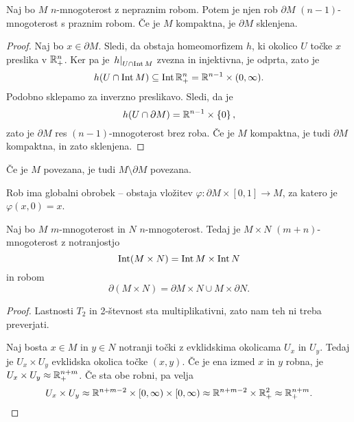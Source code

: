 \begin{izrek}
Naj bo $M$ $n$-mnogoterost z nepraznim robom. Potem je njen rob
$\partial M$ $(n-1)$-mnogoterost s praznim robom. Če je $M$
kompaktna, je $\partial M$ sklenjena.
\end{izrek}

\begin{proof}
Naj bo $x \in \partial M$. Sledi, da obstaja homeomorfizem $h$,
ki okolico $U$ točke $x$ preslika v $\mathbb{R}_+^n$. Ker pa je
$\left. h\right|_{U \cap \operatorname{Int} M}^{}$ zvezna in injektivna, je odprta, zato
je
\[
h(U \cap \operatorname{Int} M) \subseteq \operatorname{Int} \mathbb{R}_+^n =
\mathbb{R}^{n-1} \times (0, \infty).
\]
Podobno sklepamo za inverzno preslikavo. Sledi, da je
\[
h(U \cap \partial M) = \mathbb{R}^{n-1} \times \left\{0\right\},
\]
zato je $\partial M$ res $(n-1)$-mnogoterost brez roba. Če je $M$
kompaktna, je tudi $\partial M$ kompaktna, in zato sklenjena.
\end{proof}

\begin{opomba}
Če je $M$ povezana, je tudi $M \setminus \partial M$ povezana.
\end{opomba}

\begin{izrek}
Rob ima globalni obrobek -- obstaja vložitev
$\varphi \colon \partial M \times [0, 1] \to M$, za katero je
$\varphi(x, 0) = x$.
\end{izrek}


\begin{izrek}
Naj bo $M$ $m$-mnogoterost in $N$ $n$-mnogoterost. Tedaj je
$M \times N$ $(m+n)$-mnogoterost z notranjostjo
\[
\operatorname{Int} (M \times N) = \operatorname{Int} M \times \operatorname{Int} N
\]
in robom
\[
\partial (M \times N) =
\partial M \times N \cup M \times \partial N.
\]
\end{izrek}

\begin{proof}
Lastnosti $T_2$ in 2-števnost sta multiplikativni, zato nam teh ni
treba preverjati.

Naj bosta $x \in M$ in $y \in N$ notranji točki z evklidskima
okolicama $U_x$ in $U_y$. Tedaj je $U_x \times U_y$ evklidska
okolica točke $(x, y)$. Če je ena izmed $x$ in $y$ robna, je
$U_x \times U_y \approx \mathbb{R}_+^{n+m}$. Če sta obe robni, pa velja
\[
U_x \times U_y \approx
\mathbb{R}^{n+m-2} \times [0, \infty) \times [0, \infty) \approx
\mathbb{R}^{n+m-2} \times \mathbb{R}_+^2 \approx
\mathbb{R}_+^{n+m}. \qedhere
\]
\end{proof}

